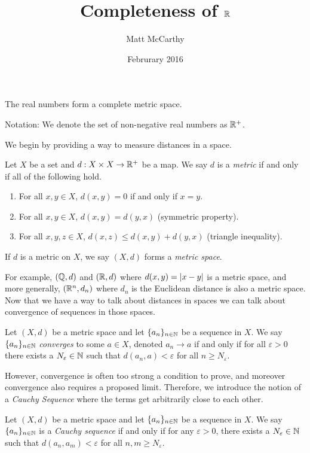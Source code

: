 \documentclass[notitlepage]{simple}
\author{Matt McCarthy}
\title{Completeness of $\mathbb{R}$}
\date{Februrary 2016}
\begin{document}
\maketitle

\begin{thm*}
	The real numbers form a complete metric space.
\end{thm*}

\noindent Notation: We denote the set of non-negative real numbers as $\mathbb{R}^+$.

We begin by providing a way to measure distances in a space.

\begin{definition}[Metric]
	Let $X$ be a set and $d:X\times X\rightarrow \mathbb{R}^+$ be a map.
	We say $d$ is a \textit{metric} if and only if all of the following hold.
	\begin{enumerate}
		\item For all $x,y\in X$, $d(x,y)=0$ if and only if $x=y$.
		\item For all $x,y\in X$, $d(x,y)=d(y,x)$ (symmetric property).
		\item For all $x,y,z\in X$, $d(x,z)\leq d(x,y)+d(y,x)$ (triangle inequality).
	\end{enumerate}
	If $d$ is a metric on $X$, we say $(X,d)$ forms a \textit{metric space}.
\end{definition}

For example, $(\mathbb{Q},d)$ and $(\mathbb{R},d)$ where $d(x,y)=\left| x-y \right|$ is a metric space,
and more generally, $(\mathbb{R}^n, d_n)$ where $d_n$ is the Euclidean distance is also a metric space.
Now that we have a way to talk about distances in spaces we can talk about convergence of sequences in those spaces.

\begin{definition}
	Let $(X,d)$ be a metric space and let $\lbrace a_n \rbrace_{n\in\mathbb{N}}$ be a sequence in $X$.
	We say $\lbrace a_n \rbrace_{n\in\mathbb{N}}$ \textit{converges} to some $a\in X$, denoted $a_n\rightarrow a$ if and only if for all $\varepsilon>0$ there exists a $N_\varepsilon\in\mathbb{N}$ such that $d(a_n,a)<\varepsilon$ for all $n\geq N_\varepsilon$.
\end{definition}

However, convergence is often too strong a condition to prove, and moreover convergence also requires a proposed limit.
Therefore, we introduce the notion of a \textit{Cauchy Sequence} where the terms get arbitrarily close to each other.

\begin{definition}
	Let $(X,d)$ be a metric space and let $\lbrace a_n \rbrace_{n\in\mathbb{N}}$ be a sequence in $X$.
	We say $\lbrace a_n \rbrace_{n\in\mathbb{N}}$ is a \textit{Cauchy sequence} if and only if for any $\varepsilon>0$, there exists a $N_\varepsilon\in\mathbb{N}$ such that $d(a_n,a_m)<\varepsilon$ for all $n,m\geq N_\varepsilon$.
\end{definition}
\end{document}
